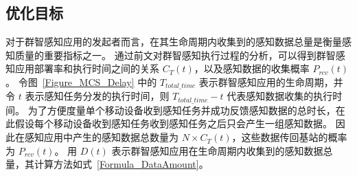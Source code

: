 





\subsection{优化目标}

对于群智感知应用的发起者而言，在其生命周期内收集到的感知数据总量是衡量感知质量的重要指标之一。
通过前文对群智感知执行过程的分析，可以得到群智感知应用部署率和执行时间之间的关系 $C_T(t)$，以及感知数据的收集概率 $P_{rcv}(t)$。
令图~\ref{Figure_MCS_Delay} 中的 $T_{total\_time}$ 表示群智感知应用的生命周期，并令 $t$ 表示感知任务分发的执行时间，则 $T_{total\_time} - t$ 代表感知数据收集的执行时间。
为了方便度量单个移动设备收到感知任务并成功反馈感知数据的总时长，在此假设每个移动设备收到感知任务收到感知任务之后只会产生一组感知数据。
因此在感知应用中产生的感知数据总数量为 $N \times C_T(t)$，这些数据传回基站的概率为 $P_{rcv}(t)$。
用 $D(t)$ 表示群智感知应用在生命周期内收集到的感知数据总量，其计算方法如式~\eqref{Formula_DataAmount}。

